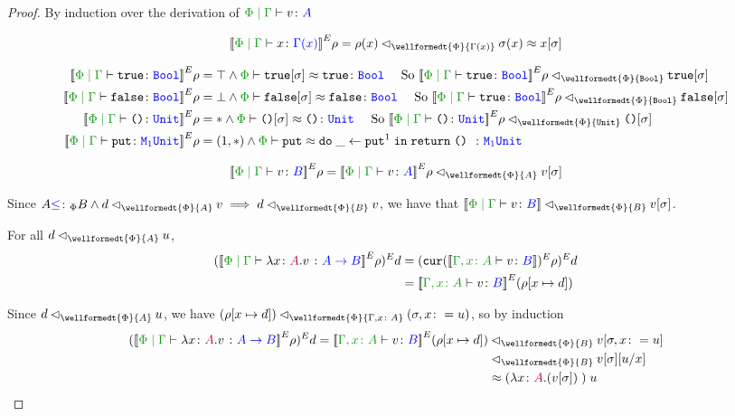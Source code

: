 \documentclass{Report}
\newcommand\eLogRel[4]{\logRel{#2}{\wellformedt{#1}{#3}}{#4}}
\newcommand\peLogRel[3]{\eLogRel{\P}{#1}{#2}{#3}}
\newcommand{\zpberelation}[2]{\berelation{\P}{#1}{#2}}
\newcommand{\fapply}[0]{^E}
\begin{document}
\begin{proof}
    By induction over the derivation of $\gpetyperelation{v}{A}$

    \begin{equation}
        \deno{\gpetyperelation{x}{\G(x)}}\fapply\rho = \peLogRel{\rho(x)}{\G(x)}{\si(x)}\beequiv x\ssi
    \end{equation}

    \begin{align*}
        \deno{\gpetyperelation{\t}{\B}}\fapply\rho & = \top \wedge \zpberelation{\t\ssi}{\t}{\B} \qt{ So } \peLogRel{\deno{\gpetyperelation{\t}{\B}}\fapply\rho}{\B}{\t\ssi}\\
        \deno{\gpetyperelation{\f}{\B}}\fapply\rho & = \bot \wedge \zpberelation{\f\ssi}{\f}{\B} \qt{ So } \peLogRel{\deno{\gpetyperelation{\t}{\B}}\fapply\rho}{\B}{\f\ssi}\\
        \deno{\gpetyperelation{\u}{\U}}\fapply\rho & = \singleton \wedge \zpberelation{\u\ssi}{\u}{\U} \qt{ So } \peLogRel{\deno{\gpetyperelation{\u}{\U}}\fapply\rho}{\U}{\u\ssi}\\
        \deno{\gpetyperelation{\put}{\M{1}{\U}}}\fapply\rho & = (1, \singleton)\wedge \zpberelation{\put}{\doin{\_}{\put^1}{\return{\u}}}{\M{1}{\U}}\\ 
    \end{align*}


    \case{\vsubtype}

    \begin{equation}
        \deno{\gpetyperelation{v}{B}}\fapply\rho = \peLogRel{\deno{\gpetyperelation{v}{A}}\fapply\rho}{A}{v\ssi}
    \end{equation}

    Since $A\subtypep B \wedge \peLogRel{d}{A}{v} \implies \peLogRel{d}{B}{v}$, we have that $\peLogRel{\deno{\gpetyperelation{v}{B}}}{B}{v\ssi}$.

    \case{\vfun}

    For all $\peLogRel{d}{A}{u}$, 
    \begin{align*}
        (\deno{\gpetyperelation{\lam{x}{A}{v}}{\ab}}\fapply\rho)\fapply d & = (\cur{\deno{\typerelation{\gax}{v}{B}}}\fapply\rho)\fapply d\\
        & = \deno{\typerelation{\gax}{v}{B}}\fapply (\rho[x\mapsto d])\\
    \end{align*}

    Since $\peLogRel{d}{A}{u}$, we have $\peLogRel{(\rho[x\mapsto d])}{\gax}{(\si, x\setto u)}$, so by induction
    \begin{align*}
        (\deno{\gpetyperelation{\lam{x}{A}{v}}{\ab}}\fapply\rho)\fapply d = \peLogRel{\deno{\typerelation{\gax}{v}{B}}\fapply(\rho[x\mapsto d])&}{B}{v\sub{\si, x\setto u}}
        \\
        \peLogRel{&}{B}{v\ssi\ssub{x}{u}}\\
        & \beequiv \apply{(\lam{x}{A}{(v\ssi)})}{u}
    \end{align*}
\end{proof}
\end{document}
